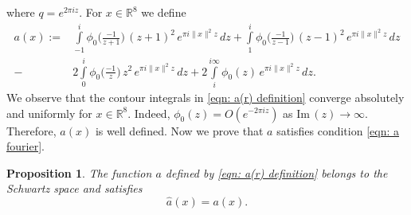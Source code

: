 \documentclass{scrartcl}
\renewcommand{\Im}{\mathrm{Im}\,}
\newcommand{\R}{\mathbb{R}}
\newtheorem{proposition}{Proposition}
\begin{document}
where $q=e^{2\pi i z}$.
For $x\in\R^8$ we define
\begin{align}\label{eqn: a(r) definition}
  a(x):=&\int\limits_{-1}^i\phi_0\Big(\frac{-1}{z+1}\Big)\,(z+1)^2\,e^{\pi i \|x\|^2 z}\,dz
  +\int\limits_{1}^i\phi_0\Big(\frac{-1}{z-1}\Big)\,(z-1)^2\,e^{\pi i \|x\|^2 z}\,dz\\
  -&2\int\limits_{0}^i\phi_0\Big(\frac{-1}{z}\Big)\,z^2\,e^{\pi i \|x\|^2 z}\,dz
  +2\int\limits_{i}^{i\infty}\phi_0(z)\,e^{\pi i \|x\|^2 z}\,dz.\nonumber
\end{align}
We observe that the contour integrals in \eqref{eqn: a(r) definition} converge absolutely and uniformly for  $x\in\R^8$. Indeed,
$\phi_0(z)=O(e^{-2\pi i z})$ as $\Im(z)\to \infty$. Therefore, $a(x)$ is well defined. Now we prove that $a$ satisfies condition \eqref{eqn: a fourier}.
\begin{proposition}\label{prop: a(r) Fourier}
The function $a$ defined by \eqref{eqn: a(r) definition} belongs to the Schwartz space and satisfies $$\widehat{a}(x)=a(x). $$
\end{proposition}
\end{document}

